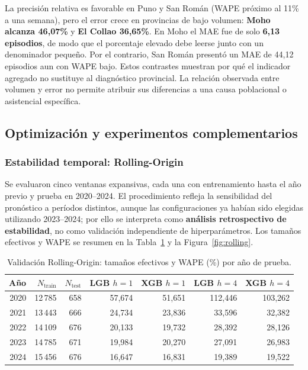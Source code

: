 \documentclass[10pt,a4paper]{article}
\begin{document}
La precisión relativa es favorable en Puno y San Román (WAPE próximo al 11\% a una semana), pero el error crece en provincias de bajo volumen: \textbf{Moho alcanza 46,07\%} y \textbf{El Collao 36,65\%}. En Moho el MAE fue de solo \textbf{6,13 episodios}, de modo que el porcentaje elevado debe leerse junto con un denominador pequeño. Por el contrario, San Román presentó un MAE de 44,12 episodios aun con WAPE bajo. Estos contrastes muestran por qué el indicador agregado no sustituye al diagnóstico provincial. La relación observada entre volumen y error no permite atribuir sus diferencias a una causa poblacional o asistencial específica.

\subsection{Optimización y experimentos complementarios}

\subsubsection{Estabilidad temporal: Rolling-Origin}

Se evaluaron cinco ventanas expansivas, cada una con entrenamiento hasta el año previo y prueba en 2020--2024. El procedimiento refleja la sensibilidad del pronóstico a períodos distintos, aunque las configuraciones ya habían sido elegidas utilizando 2023--2024; por ello se interpreta como \textbf{análisis retrospectivo de estabilidad}, no como validación independiente de hiperparámetros. Los tamaños efectivos y WAPE se resumen en la Tabla~\ref{tab:rolling} y la Figura~\ref{fig:rolling}.

\begin{table}[htbp]
\centering
\caption{Validación Rolling-Origin: tamaños efectivos y WAPE (\%) por año de prueba.}
\label{tab:rolling}
\footnotesize
\setlength{\tabcolsep}{3.5pt}
\begin{tabular}{rrrrrrr}
\toprule
\textbf{Año} & \textbf{$N_{\mathrm{train}}$} & \textbf{$N_{\mathrm{test}}$} & \textbf{LGB $h=1$} & \textbf{XGB $h=1$} & \textbf{LGB $h=4$} & \textbf{XGB $h=4$}\\
\midrule
2020 & 12\,785 & 658 & 57,674 & 51,651 & 112,446 & 103,262\\
2021 & 13\,443 & 666 & 24,734 & 23,836 & 33,596 & 32,382\\
2022 & 14\,109 & 676 & 20,133 & 19,732 & 28,392 & 28,126\\
2023 & 14\,785 & 671 & 19,984 & 20,270 & 27,091 & 26,983\\
2024 & 15\,456 & 676 & 16,647 & 16,831 & 19,389 & 19,522\\
\bottomrule
\end{tabular}
\end{table}
\end{document}
